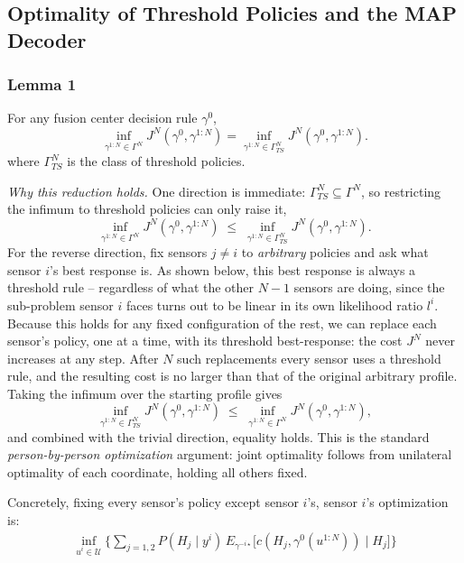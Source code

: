 \documentclass[11pt]{article}
\begin{document}
\subsection{Optimality of Threshold Policies and the MAP Decoder}
\label{sec:threshold-map}
\subsubsection*{Lemma 1}
For any fusion center decision rule $\gamma^0$,
\begin{equation}
    \inf_{\gamma^{1:N} \in \Gamma^N} J^N(\gamma^0, \gamma^{1:N})
    = \inf_{\gamma^{1:N} \in \Gamma^N_{TS}} J^N(\gamma^0, \gamma^{1:N}).
\end{equation}
where $\Gamma^N_{TS}$ is the class of threshold policies.

\smallskip
\noindent\textit{Why this reduction holds.} One direction is immediate: $\Gamma^N_{TS} \subseteq \Gamma^N$, so restricting the infimum to threshold policies can only raise it,
\begin{equation}
    \inf_{\gamma^{1:N} \in \Gamma^N} J^N(\gamma^0,\gamma^{1:N}) \;\le\; \inf_{\gamma^{1:N} \in \Gamma^N_{TS}} J^N(\gamma^0,\gamma^{1:N}).
\end{equation}
For the reverse direction, fix sensors $j \ne i$ to \emph{arbitrary} policies and ask what sensor $i$'s best response is. As shown below, this best response is always a threshold rule -- regardless of what the other $N-1$ sensors are doing, since the sub-problem sensor $i$ faces turns out to be linear in its own likelihood ratio $l^i$. Because this holds for any fixed configuration of the rest, we can replace each sensor's policy, one at a time, with its threshold best-response: the cost $J^N$ never increases at any step. After $N$ such replacements every sensor uses a threshold rule, and the resulting cost is no larger than that of the original arbitrary profile. Taking the infimum over the starting profile gives
\begin{equation}
    \inf_{\gamma^{1:N} \in \Gamma^N_{TS}} J^N(\gamma^0,\gamma^{1:N}) \;\le\; \inf_{\gamma^{1:N} \in \Gamma^N} J^N(\gamma^0,\gamma^{1:N}),
\end{equation}
and combined with the trivial direction, equality holds. This is the standard \emph{person-by-person optimization} argument: joint optimality follows from unilateral optimality of each coordinate, holding all others fixed.

\smallskip
\noindent Concretely, fixing every sensor's policy except sensor $i$'s, sensor $i$'s optimization is:
\begin{align}
    \inf_{u^i \in \mathcal U} \bigg\{\sum_{j=1,2} P(H_j \mid y^i)\, E_{\gamma^{-i\star}}\big[c(H_j, \gamma^0(u^{1:N})) \mid H_j\big]\bigg\}
\end{align}
\end{document}
